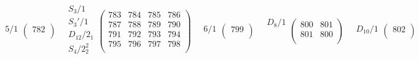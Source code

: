 \documentclass[11pt,a4paper]{amsart}
\begin{document}
\begin{align*}
\begin{array}{c}%
5/1 \\
\end{array}
\left(\begin{array}{r}%
782\\%
\end{array}\right)%
\quad
\begin{array}{c}%
S_3/1 \\ \hline
S_3'/1 \\ \hline
D_{12}/2_1 \\ \hline
S_4/2^2_2 \\ 
\end{array}
\left(\begin{array}{r|r|r|r}%
783&784&785&786\\%
\hline
787&788&789&790\\%
\hline
791&792&793&794\\%
\hline
795&796&797&798\\%
\end{array}\right)%
\quad
\begin{array}{c}%
6/1 \\
\end{array}
\left(\begin{array}{r}%
799\\%
\end{array}\right)%
\quad
\begin{array}{c}%
D_8/1 \\
\phantom{D_8/1} \\
\end{array}
\left(\begin{array}{rr}%
800&801\\%
801&800\\%
\end{array}\right)%
\quad
\begin{array}{c}%
D_{10}/1 \\
\end{array}
\left(\begin{array}{r}%
802\\%
\end{array}\right)%
\end{align*}
\end{document}
